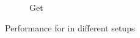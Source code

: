 \begin{figure}[t]
\begin{subfigure}{0.45\textwidth}
      \caption{Get}
      \label{fig:geo_tpcc_commit}
    \end{subfigure}
  \caption{Performance for \name in different setups}
  \label{fig:geo_tpcc}
\end{figure}

